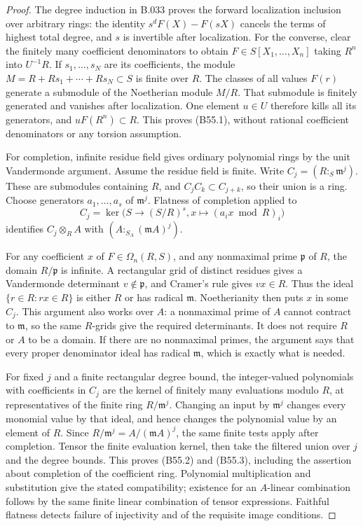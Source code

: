 \begin{proof}
The degree induction in B.033 proves the forward localization
inclusion over arbitrary rings: the identity
$s^dF(X)-F(sX)$ cancels the terms of highest total degree,
and $s$ is invertible after localization. For the converse,
clear the finitely many coefficient denominators to obtain
$F\in S[X_1,\ldots,X_n]$ taking $R^n$ into $U^{-1}R$.
If $s_1,\ldots,s_N$ are its coefficients, the module
$M=R+Rs_1+\cdots+Rs_N\subset S$ is finite over $R$.
The classes of all values $F(r)$ generate a submodule of
the Noetherian module $M/R$. That submodule is finitely
generated and vanishes after localization. One element
$u\in U$ therefore kills all its generators, and
$uF(R^n)\subset R$. This proves (B55.1), without rational
coefficient denominators or any torsion assumption.

For completion, infinite residue field gives ordinary
polynomial rings by the unit Vandermonde argument. Assume
the residue field is finite. Write $C_j=(R:_S\mathfrak m^j)$.
These are submodules containing $R$, and
$C_jC_k\subset C_{j+k}$, so their union is a ring.
Choose generators $a_1,\ldots,a_s$ of $\mathfrak m^j$.
Flatness of completion applied to
\[
 C_j=\ker\bigl(S\longrightarrow(S/R)^s,
                   x\longmapsto(a_ix\bmod R)_i\bigr)
\]
identifies $C_j\otimes_R A$ with
$(A:_{S_A}(\mathfrak m A)^j)$.

For any coefficient $x$ of $F\in\Omega_n(R,S)$, and any
nonmaximal prime $\mathfrak p$ of $R$, the domain
$R/\mathfrak p$ is infinite. A rectangular grid of
distinct residues gives a Vandermonde determinant
$v\notin\mathfrak p$, and Cramer's rule gives $vx\in R$.
Thus the ideal $\{r\in R:rx\in R\}$ is either $R$ or
has radical $\mathfrak m$. Noetherianity then puts $x$
in some $C_j$. This argument also works over $A$:
a nonmaximal prime of $A$ cannot contract to
$\mathfrak m$, so the same $R$-grids give the required
determinants. It does not require $R$ or $A$ to be a domain.
If there are no nonmaximal primes, the argument says that
every proper denominator ideal has radical $\mathfrak m$,
which is exactly what is needed.

For fixed $j$ and a finite rectangular degree bound, the
integer-valued polynomials with coefficients in $C_j$
are the kernel of finitely many evaluations modulo $R$,
at representatives of the finite ring $R/\mathfrak m^j$.
Changing an input by $\mathfrak m^j$ changes every
monomial value by that ideal, and hence changes the
polynomial value by an element of $R$. Since
$R/\mathfrak m^j=A/(\mathfrak m A)^j$, the same finite
tests apply after completion. Tensor the finite evaluation
kernel, then take the filtered union over $j$ and the
degree bounds. This proves (B55.2) and (B55.3), including
the assertion about completion of the coefficient ring.
Polynomial multiplication and substitution give the stated
compatibility; existence for an $A$-linear combination
follows by the same finite linear combination of tensor
expressions. Faithful flatness detects failure of
injectivity and of the requisite image conditions.
\end{proof}

